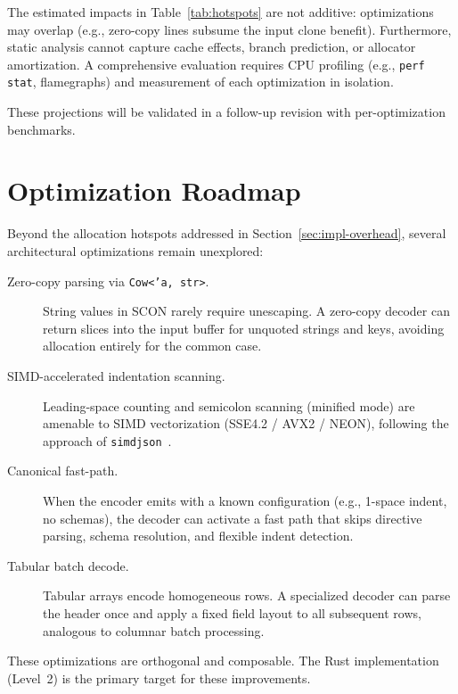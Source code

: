\documentclass[11pt, a4paper]{article}
\begin{document}
The estimated impacts in Table~\ref{tab:hotspots} are not additive:
optimizations may overlap (e.g., zero-copy lines subsume the input clone
benefit). Furthermore, static analysis cannot capture cache effects,
branch prediction, or allocator amortization. A comprehensive evaluation
requires CPU profiling (e.g., \texttt{perf stat}, flamegraphs) and
measurement of each optimization in isolation.

These projections will be validated in a follow-up revision
with per-optimization benchmarks.

\section{Optimization Roadmap}
\label{sec:roadmap}

Beyond the allocation hotspots addressed in Section~\ref{sec:impl-overhead},
several architectural optimizations remain unexplored:

\begin{description}
\item[Zero-copy parsing via \texttt{Cow<'a, str>}.]
  String values in SCON rarely require unescaping. A zero-copy decoder
  can return slices into the input buffer for unquoted strings and keys,
  avoiding allocation entirely for the common case.

\item[SIMD-accelerated indentation scanning.]
  Leading-space counting and semicolon scanning (minified mode) are
  amenable to SIMD vectorization (SSE4.2 / AVX2 / NEON), following
  the approach of \texttt{simdjson}~\cite{simdjson}.

\item[Canonical fast-path.]
  When the encoder emits with a known configuration (e.g., 1-space indent,
  no schemas), the decoder can activate a fast path that skips directive
  parsing, schema resolution, and flexible indent detection.

\item[Tabular batch decode.]
  Tabular arrays encode homogeneous rows. A specialized decoder can parse
  the header once and apply a fixed field layout to all subsequent rows,
  analogous to columnar batch processing.
\end{description}

\noindent These optimizations are orthogonal and composable. The Rust
implementation (Level~2) is the primary target for these improvements.
\end{document}
